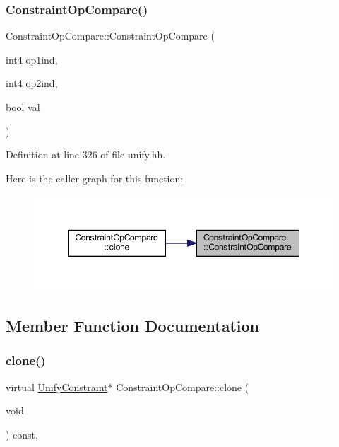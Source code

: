 \subsubsection{\texorpdfstring{ConstraintOpCompare()}{ConstraintOpCompare()}}
{\footnotesize\ttfamily Constraint\+Op\+Compare\+::\+Constraint\+Op\+Compare (\begin{DoxyParamCaption}\item[{int4}]{op1ind,  }\item[{int4}]{op2ind,  }\item[{bool}]{val }\end{DoxyParamCaption})\hspace{0.3cm}{\ttfamily [inline]}}



Definition at line 326 of file unify.\+hh.

Here is the caller graph for this function\+:
\nopagebreak
\begin{figure}[H]
\begin{center}
\leavevmode
\includegraphics[width=348pt]{class_constraint_op_compare_a8cf67d67a93504713c5ad842adfb7b3d_icgraph}
\end{center}
\end{figure}


\subsection{Member Function Documentation}
\mbox{\label{class_constraint_op_compare_ae99b6c25cca1f8587d661847e474e062}} 
\subsubsection{\texorpdfstring{clone()}{clone()}}
{\footnotesize\ttfamily virtual \mbox{\hyperlink{class_unify_constraint}{Unify\+Constraint}}$\ast$ Constraint\+Op\+Compare\+::clone (\begin{DoxyParamCaption}\item[{void}]{ }\end{DoxyParamCaption}) const\hspace{0.3cm}{\ttfamily [inline]}, {\ttfamily [virtual]}}



